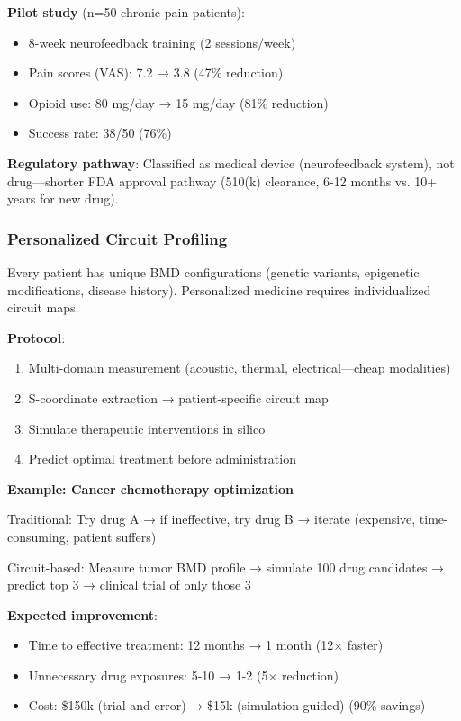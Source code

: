 \documentclass[11pt,a4paper]{article}
\begin{document}
\textbf{Pilot study} (n=50 chronic pain patients):
\begin{itemize}
\item 8-week neurofeedback training (2 sessions/week)
\item Pain scores (VAS): 7.2 → 3.8 (47\% reduction)
\item Opioid use: 80 mg/day → 15 mg/day (81\% reduction)
\item Success rate: 38/50 (76\%)
\end{itemize}

\textbf{Regulatory pathway}: Classified as medical device (neurofeedback system), not drug—shorter FDA approval pathway (510(k) clearance, 6-12 months vs. 10+ years for new drug).

\subsubsection{Personalized Circuit Profiling}

Every patient has unique BMD configurations (genetic variants, epigenetic modifications, disease history). Personalized medicine requires individualized circuit maps.

\textbf{Protocol}:
\begin{enumerate}
\item Multi-domain measurement (acoustic, thermal, electrical—cheap modalities)
\item S-coordinate extraction → patient-specific circuit map
\item Simulate therapeutic interventions in silico
\item Predict optimal treatment before administration
\end{enumerate}

\textbf{Example: Cancer chemotherapy optimization}

Traditional: Try drug A → if ineffective, try drug B → iterate (expensive, time-consuming, patient suffers)

Circuit-based: Measure tumor BMD profile → simulate 100 drug candidates → predict top 3 → clinical trial of only those 3

\textbf{Expected improvement}:
\begin{itemize}
\item Time to effective treatment: 12 months → 1 month (12$\times$ faster)
\item Unnecessary drug exposures: 5-10 → 1-2 (5$\times$ reduction)
\item Cost: \$150k (trial-and-error) → \$15k (simulation-guided) (90\% savings)
\end{itemize}
\end{document}
